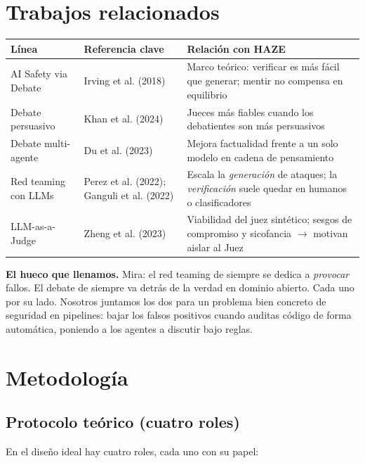 \documentclass[10pt]{article}
\begin{document}
\section{Trabajos relacionados}

\begin{table}[h]
\centering
\small
\begin{tabularx}{\textwidth}{@{}L{3cm} L{3.5cm} X@{}}
\toprule
Línea & Referencia clave & Relación con HAZE \\
\midrule
AI Safety via Debate & Irving et al. (2018) & Marco teórico: verificar es más fácil que
generar; mentir no compensa en equilibrio \\
Debate persuasivo & Khan et al. (2024) & Jueces más fiables cuando los debatientes son
más persuasivos \\
Debate multi-agente & Du et al. (2023) & Mejora factualidad frente a un solo modelo en
cadena de pensamiento \\
Red teaming con LLMs & Perez et al. (2022); Ganguli et al. (2022) & Escala la
\textit{generación} de ataques; la \textit{verificación} suele quedar en humanos o
clasificadores \\
LLM-as-a-Judge & Zheng et al. (2023) & Viabilidad del juez sintético; sesgos de
compromiso y sicofancia $\rightarrow$ motivan aislar al Juez \\
\bottomrule
\end{tabularx}
\end{table}

\textbf{El hueco que llenamos.} Mira: el red teaming de siempre se dedica a
\textit{provocar} fallos. El debate de siempre va detrás de la verdad en dominio
abierto. Cada uno por su lado. Nosotros juntamos los dos para un problema bien concreto
de seguridad en pipelines: bajar los falsos positivos cuando auditas código de forma
automática, poniendo a los agentes a discutir bajo reglas.

\section{Metodología}

\subsection{Protocolo teórico (cuatro roles)}

En el diseño ideal hay cuatro roles, cada uno con su papel:
\end{document}
